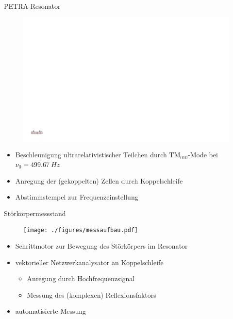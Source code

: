 \documentclass[12pt,xcolor=dvipsnames,professionalfonts]{beamer}
\begin{document}
\begin{frame}{PETRA-Resonator}
	\begin{figure}
		\centering
		\includegraphics[scale=0.6]{./figures/cavity.pdf}
	\end{figure}
	
	\begin{itemize}
		\setlength\itemsep{1.0em}
		\item Beschleunigung ultrarelativistischer Teilchen durch $\mathrm{TM}_{010}$-Mode bei $\nu_0 = \SI{499.67}{Hz}$
		
		\item Anregung der (gekoppelten) Zellen durch Koppelschleife
		
		\item Abstimmstempel zur Frequenzeinstellung
		
	\end{itemize}
\end{frame}

\begin{frame}{Störkörpermessstand}
	\begin{figure}
		\centering
		\texttt{[image: ./figures/messaufbau.pdf]}
	\end{figure}
	\begin{itemize}
		\setlength\itemsep{0.5em}
		\item Schrittmotor zur Bewegung des Störkörpers im Resonator
		\item vektorieller Netzwerkanalysator an Koppelschleife
		\begin{itemize}
			\item Anregung durch Hochfrequenzsignal
			\item Messung des (komplexen) Reflexionsfaktors
		\end{itemize}
		\item automatisierte Messung
	\end{itemize}	
\end{frame}
\end{document}
